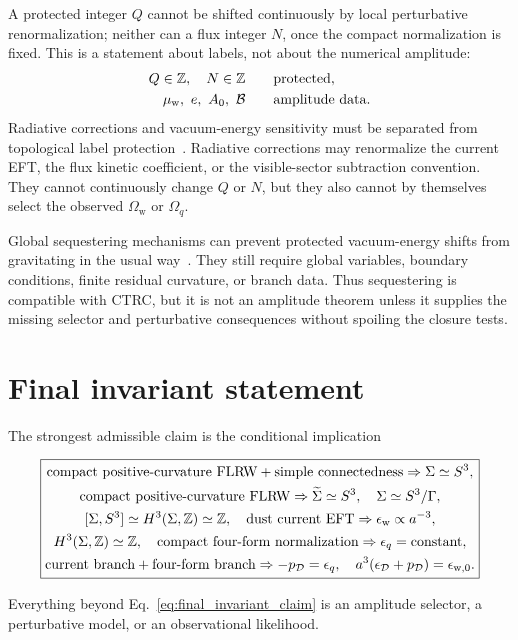 \documentclass[
  aps,
  prd,
  reprint,
  superscriptaddress,
  floatfix,
  nofootinbib,
  longbibliography
]{revtex4-2}
\theoremstyle{plain}
\theoremstyle{definition}
\theoremstyle{remark}
\newcommand{\D}{\mathcal D}
\newcommand{\w}{\mathrm w}
\newcommand{\Ow}{\Omega_{\mathrm w}}
\newcommand{\Oq}{\Omega_q}
\newcommand{\Z}{\mathbb Z}
\newcommand{\eps}{\epsilon}
\begin{document}
A protected integer \(Q\) cannot be shifted continuously by local perturbative
renormalization; neither can a flux integer \(N\), once the compact normalization
is fixed.  This is a statement about labels, not about the numerical amplitude:
\begin{align}
Q\in\Z,\quad N\in\Z
&\qquad \hbox{protected},
\label{eq:protected_vs_amplitude}\\
\mu_{\w},\ e,\ A_0,\ \mathcal B
&\qquad \hbox{amplitude data}.
\nonumber
\end{align}
Radiative corrections and vacuum-energy sensitivity must be separated from
topological label protection~\cite{WeinbergCC}.  Radiative corrections may
renormalize the current EFT, the flux kinetic coefficient, or the visible-sector
subtraction convention.  They cannot continuously change \(Q\) or \(N\), but
they also cannot by themselves select the observed \(\Ow\) or \(\Oq\).

Global sequestering mechanisms can prevent protected vacuum-energy shifts from
gravitating in the usual way~\cite{KaloperPadilla}.  They still require global
variables, boundary conditions, finite residual curvature, or branch data.  Thus
sequestering is compatible with CTRC, but it is not an amplitude theorem unless
it supplies the missing selector and perturbative consequences without spoiling
the closure tests.

\section{Final invariant statement}

The strongest admissible claim is the conditional implication
\begin{widetext}
\begin{equation}
\boxed{
\begin{gathered}
\hbox{compact positive-curvature FLRW}
+\hbox{simple connectedness}
\Rightarrow \Sigma\simeq S^3,\\
\hbox{compact positive-curvature FLRW}
\Rightarrow \widetilde\Sigma\simeq S^3,\quad
\Sigma\simeq S^3/\Gamma,\\
[\Sigma,S^3]\simeq H^3(\Sigma,\Z)\simeq\Z,\quad
\hbox{dust current EFT}
\Rightarrow \eps_{\w}\propto a^{-3},\\
H^3(\Sigma,\Z)\simeq\Z,\quad
\hbox{compact four-form normalization}
\Rightarrow \eps_q=\hbox{constant},\\
\hbox{current branch}+\hbox{four-form branch}
\Rightarrow
-p_\D=\eps_q,\quad
a^3(\eps_\D+p_\D)=\eps_{\w,0}.
\end{gathered}}
\label{eq:final_invariant_claim}
\end{equation}
\end{widetext}
Everything beyond Eq.~\eqref{eq:final_invariant_claim} is an amplitude selector, a perturbative model, or an observational likelihood.
\end{document}
